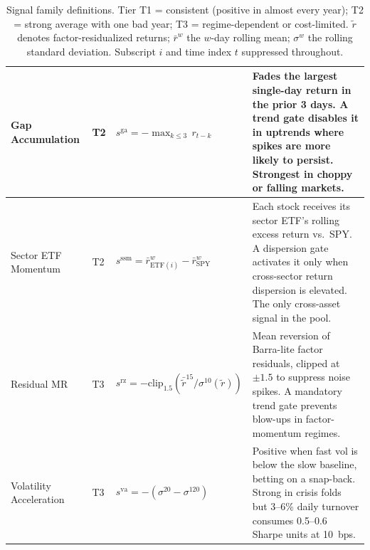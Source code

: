 \begin{table}[H]
\begin{tabularx}{\textwidth}{p{} p{} >{\raggedright\arraybackslash}X >{\raggedright\arraybackslash}p{}}
        Gap Accumulation &
        T2 &
        $s^{\mathrm{ga}} = -\max_{k \leq 3}\, r_{t-k}$ &
        Fades the largest single-day return in the prior 3 days. A trend gate disables it in uptrends where spikes are more likely to persist. Strongest in choppy or falling markets. \\
        \midrule

        Sector ETF Momentum &
        T2 &
        $s^{\mathrm{ssm}} = \bar{r}^w_{\mathrm{ETF}(i)} - \bar{r}^w_{\mathrm{SPY}}$ &
        Each stock receives its sector ETF's rolling excess return vs.\ SPY. A dispersion gate activates it only when cross-sector return dispersion is elevated. The only cross-asset signal in the pool. \\
        \midrule

        Residual MR &
        T3 &
        $s^{\mathrm{rz}} = -\mathrm{clip}_{1.5}(\bar{\tilde{r}}^{15} / \sigma^{10}(\tilde{r}))$ &
        Mean reversion of Barra-lite factor residuals, clipped at $\pm 1.5$ to suppress noise spikes. A mandatory trend gate prevents blow-ups in factor-momentum regimes. \\
        \midrule

        Volatility Acceleration &
        T3 &
        $s^{\mathrm{va}} = -(\sigma^{20} - \sigma^{120})$ &
        Positive when fast vol is below the slow baseline, betting on a snap-back. Strong in crisis folds but 3--6\% daily turnover consumes 0.5--0.6 Sharpe units at 10~bps. \\

        \bottomrule
    \end{tabularx}
    \caption{Signal family definitions. Tier T1 = consistent (positive in almost every year); T2 = strong average with one bad year; T3 = regime-dependent or cost-limited. $\tilde{r}$ denotes factor-residualized returns; $\bar{r}^w$ the $w$-day rolling mean; $\sigma^w$ the rolling standard deviation. Subscript $i$ and time index $t$ suppressed throughout.}
    \label{tab:signal_families}
\end{table}
